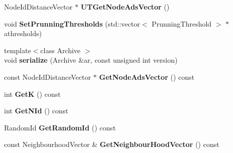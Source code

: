 \begin{DoxyCompactItemize}
\item 
\hypertarget{classall__distance__sketch_1_1NodeSketch_abd0a89894fa7d740ae5536f3b0185b2e}{}Node\+Id\+Distance\+Vector $\ast$ {\bfseries U\+T\+Get\+Node\+Ads\+Vector} ()\label{classall__distance__sketch_1_1NodeSketch_abd0a89894fa7d740ae5536f3b0185b2e}

\item 
\hypertarget{classall__distance__sketch_1_1NodeSketch_aa429b859c91df5cd50c3e4d6f41f5c2c}{}void {\bfseries Set\+Prunning\+Thresholds} (std\+::vector$<$ Prunning\+Threshold $>$ $\ast$athresholds)\label{classall__distance__sketch_1_1NodeSketch_aa429b859c91df5cd50c3e4d6f41f5c2c}

\item 
\hypertarget{classall__distance__sketch_1_1NodeSketch_a8d8633dbc488df5b512ab7c455085c9d}{}{\footnotesize template$<$class Archive $>$ }\\void {\bfseries serialize} (Archive \&ar, const unsigned int version)\label{classall__distance__sketch_1_1NodeSketch_a8d8633dbc488df5b512ab7c455085c9d}

\item 
\hypertarget{classall__distance__sketch_1_1NodeSketch_ac2200cc2ae91ab7745d4b3151229bfe3}{}const Node\+Id\+Distance\+Vector $\ast$ {\bfseries Get\+Node\+Ads\+Vector} () const \label{classall__distance__sketch_1_1NodeSketch_ac2200cc2ae91ab7745d4b3151229bfe3}

\item 
\hypertarget{classall__distance__sketch_1_1NodeSketch_af55cb9bdc148cba0c2bb35a8e101b6e9}{}int {\bfseries Get\+K} () const \label{classall__distance__sketch_1_1NodeSketch_af55cb9bdc148cba0c2bb35a8e101b6e9}

\item 
\hypertarget{classall__distance__sketch_1_1NodeSketch_a15156f70b8b148d4706ce13c3db5ead7}{}int {\bfseries Get\+N\+Id} () const \label{classall__distance__sketch_1_1NodeSketch_a15156f70b8b148d4706ce13c3db5ead7}

\item 
\hypertarget{classall__distance__sketch_1_1NodeSketch_a75e3d722870d4ff73e6943484a4ab62e}{}Random\+Id {\bfseries Get\+Random\+Id} () const \label{classall__distance__sketch_1_1NodeSketch_a75e3d722870d4ff73e6943484a4ab62e}

\item 
\hypertarget{classall__distance__sketch_1_1NodeSketch_a7c05d7a8520827c11551b056f332ffc5}{}const Neighbourhood\+Vector \& {\bfseries Get\+Neighbour\+Hood\+Vector} () const \label{classall__distance__sketch_1_1NodeSketch_a7c05d7a8520827c11551b056f332ffc5}


\end{DoxyCompactItemize}
